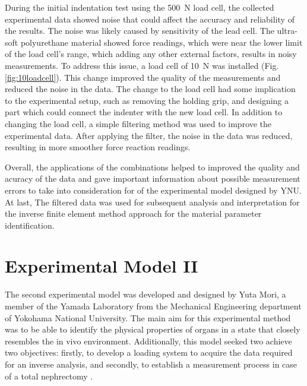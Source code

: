 During the initial indentation test using the \SI{500}{\newton} load cell, 
the collected experimental data showed noise that could affect the accuracy 
and reliability of the results. The noise was likely caused by sensitivity 
of the lead cell. The ultra-soft polyurethane material showed force readings, which 
were near the lower limit of the load cell's range, which adding any other external factors, 
results in noisy measurements. To address this issue, a load cell of \SI{10}{\newton}
was installed (Fig. \ref{fig:10loadcell}). This change improved the quality of 
the measurements and reduced the noise in the data. The change to the load cell had some 
implication to the experimental setup, such as removing the holding grip, and designing 
a part which could connect the indenter with the new load cell. In addition to changing 
the load cell, a simple filtering method was used to improve the experimental data. After 
applying the filter, the noise in the data was reduced, resulting in more smoother 
force reaction readings. 

Overall, the applications of the combinations helped to improved the quality and acuracy 
of the data and gave important information about possible measurement errors to 
take into consideration for of the experimental model 
designed by YNU. At last, The filtered data was used for subsequent analysis and 
interpretation for the inverse finite element method approach for the material parameter 
identification.


\section{Experimental Model II}
\label{section:expmod2}

The second experimental model was developed and designed by Yuta Mori, a 
member of the Yamada Laboratory from the Mechanical Engineering department of 
 Yokohama National University. 
The main aim for this experimental method was to be able to identify the physical 
properties of organs in a state that closely resembles the in vivo environment.
Additionally, this model seeked two achieve two objectives: firstly, to develop a 
loading system to acquire the data required for an inverse analysis, and secondly, 
to establish a measurement process in case of a total nephrectomy \cite{Mori2022}. 

